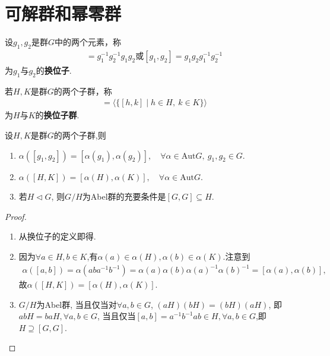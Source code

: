 \documentclass[../../main.tex]{subfiles}%
\begin{document}
\section{可解群和幂零群}

\begin{definition}[换位子]
设$g_1, g_2$是群$G$中的两个元素，称
\begin{align*}
[g_1, g_2] = g_1^{-1}g_2^{-1}g_1g_2\text{或}[g_1,g_2]=g_1g_2g_1^{-1}g_2^{-1}
\end{align*}
为$g_1$与$g_2$的\textbf{换位子}.
\end{definition}

\begin{definition}[换位子群]
若$H, K$是群$G$的两个子群，称
\begin{align*}
[H, K] = \langle \{[h, k] \mid h \in H,\ k \in K\} \rangle
\end{align*}
为$H$与$K$的\textbf{换位子群}.
\end{definition}

\begin{proposition}\label{proposition:换位子(群)保持群自同构}
设$H, K$是群$G$的两个子群,则
\begin{enumerate}[(1)]
\item\label{proposition:换位子(群)保持群自同构-1} $\alpha([g_1, g_2]) = [\alpha(g_1), \alpha(g_2)],\quad \forall \alpha \in \mathrm{Aut}G,\ g_1, g_2 \in G.$

\item\label{proposition:换位子(群)保持群自同构-2} $\alpha([H, K]) = [\alpha(H), \alpha(K)],\quad \forall \alpha \in \mathrm{Aut}G.$

\item\label{proposition:换位子(群)保持群自同构-3} 若$H\lhd G$, 则$G/H$为Abel群的充要条件是$[G,G]\subseteq H$.
\end{enumerate}
\end{proposition}
\begin{proof}
\begin{enumerate}[(1)]
\item 从换位子的定义即得.

\item 因为$\forall a\in H,b\in K$,有$\alpha(a)\in \alpha(H),\alpha(b)\in \alpha(K)$.注意到
\begin{align*}
\alpha([a,b])=\alpha(aba^{-1}b^{-1})=\alpha(a)\alpha(b)\alpha(a)^{-1}\alpha(b)^{-1}=[\alpha(a),\alpha(b)],
\end{align*}
故$\alpha([H,K])=[\alpha(H),\alpha(K)]$.

\item $G/H$为Abel群, 当且仅当对$\forall a,b\in G$, $(aH)(bH)=(bH)(aH)$, 即$abH=baH,\forall a,b\in G$, 当且仅当$[a,b]=a^{-1}b^{-1}ab\in H,\forall a,b\in G$,即$H\supseteq [G,G]$.
\end{enumerate}
\end{proof}
\end{document}
